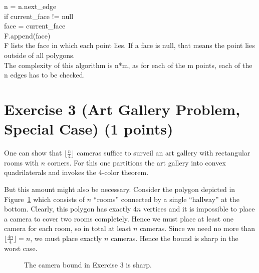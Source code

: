 \documentclass[english, fontsize=12pt, paper=a4, twoside=false, draft=true, pagesize=auto, version=last, DIV=16]{scrartcl}
\theoremstyle{break}
\begin{document}
\hspace*{10mm}\hspace*{10mm}\hspace*{10mm}n = n.next\_edge\\
\hspace*{10mm}\hspace*{10mm}if current\_face != null\\
\hspace*{10mm}\hspace*{10mm}\hspace*{10mm}face = current\_face\\
\hspace*{10mm}F.append(face)\\

F lists the face in which each point lies. If a face is null, that means the point lies outside of all polygons.\\
The complexity of this algorithm is n*m, as for each of the m points, each of the n edges has to be checked.

\newpage

\section*{Exercise 3 (Art Gallery Problem, Special Case) {\large \hfill (1 points)}}

One can show that $\lfloor\frac n4\rfloor$ cameras suffice to surveil an art gallery with
rectangular rooms with $n$ corners. For this one partitions the art gallery into convex
quadrilaterals and invokes the 4-color theorem.

But this amount might also be necessary. Consider the polygon depicted in
Figure~\ref{fig:artgallery} which consists of $n$ \enquote{rooms} connected by a single
\enquote{hallway} at the bottom. Clearly, this polygon has exactly $4n$ vertices and it is
impossible to place a camera to cover two rooms completely. Hence we must place at least
one camera for each room, so in total at least $n$ cameras. Since  we need no more than
$\lfloor\frac{4n}4\rfloor = n$, we must place exactly $n$ cameras. Hence the bound is
sharp in the worst case.

\begin{figure}[htb]
  \centering
  \caption{The camera bound in Exercise 3 is sharp.}
  \label{fig:artgallery}
\end{figure}
\end{document}
